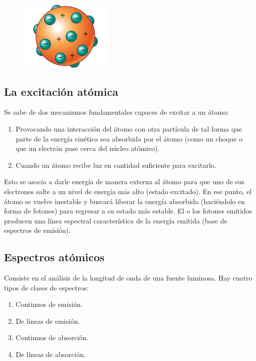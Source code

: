 \documentclass[a4paper]{article}
\begin{document}
        \begin{figure}[h!]
            \centering
            \includegraphics[width=4.5cm]{../imagenes/modeloAtomicoThomson.jpeg}
        \end{figure}

    \subsection{La excitación atómica}
        \indent Se sabe de dos mecanismos fundamentales capaces de excitar a un átomo:

        \renewcommand{\theenumi}{\roman{enumi}}
        \begin{enumerate}
            \item Provocando una interacción del átomo con otra partícula de tal forma que parte de la energía cinética sea absorbida por el átomo (como un choque o que un electrón pase cerca del núcleo atómico).
            \item Cuando un átomo recibe luz en cantidad suficiente para excitarlo.
        \end{enumerate}

        \indent Esto se asocia a darle energía de manera externa al átomo para que uno de sus electrones salte a un nivel de energía más alto (estado excitado). En ese punto, el átomo se vuelve inestable y buscará liberar la energía absorbida (haciéndolo en forma de fotones) para regresar a su estado más estable.
        \indent El o los fotones emitidos producen una línea espectral característica de la energía emitida (base de espectros de emisión).

    \subsection{Espectros atómicos}
        \indent Consiste en el análisis de la longitud de onda de una fuente luminosa. Hay cuatro tipos de clases de espectros:
        \begin{enumerate}
            \item Continuos de emisión.
            \item De líneas de emisión.
            \saltoPag
            \item Continuos de absorción.
            \item De líneas de absorción.
        \end{enumerate}
\end{document}

